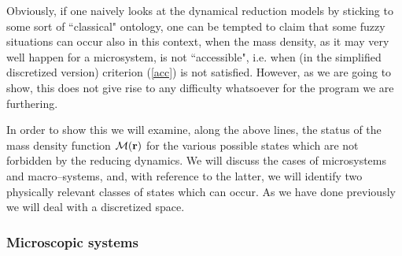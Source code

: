 \documentclass[10pt,a4paper]{article}
\begin{document}
Obviously, if one naively looks at the dynamical reduction models
by sticking to some sort of ``classical" ontology, one can be
tempted to claim that some fuzzy situations can occur also in this
context, when the mass density, as it may very well happen for a
microsystem, is not ``accessible", i.e. when (in the simplified
discretized version) criterion (\ref{acc}) is not satisfied.
However, as we are going to show, this does not give rise to any
difficulty whatsoever for the program we are furthering.

In order to show this we will examine, along the above lines, the
status of the mass density function ${\mathcal M}({\bf r})$ for
the various possible states which are not forbidden by the
reducing dynamics. We will discuss the cases of microsystems and
macro--systems, and, with reference to the latter, we will
identify two physically relevant classes of states which can
occur. As we have done previously we will deal with a discretized
space.

\subsubsection{Microscopic systems} \label{sec1231}
\end{document}
